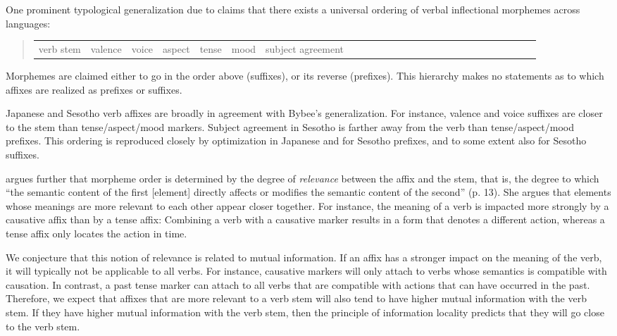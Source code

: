 One prominent typological generalization due to \citet[p. 24, 34--35]{bybee-morphology-1985} claims that there exists a universal ordering of verbal inflectional morphemes across languages:
\begin{quote}
\begin{tabular}{llllllllllllllllllllllllll}
verb stem & valence & voice & aspect & tense& mood &  subject agreement
\end{tabular}
\end{quote}
Morphemes are claimed either to go in the order above (suffixes), or its reverse (prefixes). This hierarchy makes no statements as to which affixes are realized as prefixes or suffixes.

Japanese and Sesotho verb affixes are broadly in agreement with Bybee's generalization.
For instance, valence and voice suffixes are closer to the stem than tense/aspect/mood markers.
Subject agreement in Sesotho is farther away from the verb than tense/aspect/mood prefixes.
This ordering is reproduced closely by optimization in Japanese and for Sesotho prefixes, and to some extent also for Sesotho suffixes.

\citet[p. 37]{bybee-morphology-1985} argues further that morpheme order is determined by the degree of \emph{relevance} between the affix and the stem, that is, the degree to which ``the semantic content of the first [element] directly affects or modifies the semantic content of the second'' (p. 13).
She argues that elements whose meanings are more relevant to each other appear closer together.
For instance, the meaning of a verb is impacted more strongly by a causative affix than by a tense affix:
Combining a verb with a causative marker results in a form that denotes a different action, whereas a tense affix only locates the action in time.

We conjecture that this notion of relevance is related to mutual information.
If an affix has a stronger impact on the meaning of the verb, it will typically not be applicable to all verbs.
For instance, causative markers will only attach to verbs whose semantics is compatible with causation.
In contrast, a past tense marker can attach to all verbs that are compatible with actions that can have occurred in the past.
Therefore, we expect that affixes that are more relevant to a verb stem will also tend to have higher mutual information with the verb stem.
If they have higher mutual information with the verb stem, then the principle of information locality predicts that they will go close to the verb stem.
